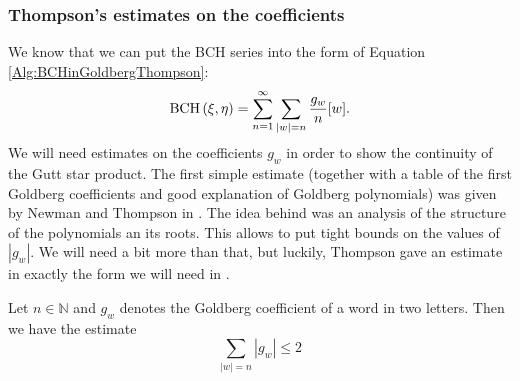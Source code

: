\subsubsection{Thompson's estimates on the coefficients}
We know that we can put the BCH series into the form of Equation 
\eqref{Alg:BCHinGoldbergThompson}:
\begin{equation}
	\mathrm{BCH}\left(\xi, \eta\right)
	=
	\sum\limits_{n = 1}^{\infty}
	\sum\limits_{|w| = n}
	\frac{g_w}{n} [w].
\end{equation}
We will need estimates on the coefficients $g_w$ in order to show the 
continuity of the Gutt star product. The first simple estimate (together with a 
table of the first Goldberg coefficients and good explanation of Goldberg 
polynomials) was given by Newman and Thompson in \cite{newman.thompson:1987a}. 
The idea behind was an analysis of the structure of the polynomials an its 
roots. This allows to put tight bounds on the values of $|g_w|$. We will need a 
bit more than that, but luckily, Thompson gave an estimate in exactly the form 
we will need in \cite{thompson:1989a}.
\begin{proposition}
	\label{Alg:Prop:ThompsonsEstimate}
	Let $n \in \mathbb{N}$ and $g_w$ denotes the Goldberg coefficient of a 
	word in two letters. Then we have the estimate
	\begin{equation}
		\label{Alg:ThompsonsEstimate}
		\sum\limits_{|w| = n}
		\left| g_w \right|
		\leq
		2
	\end{equation}
\end{proposition}

